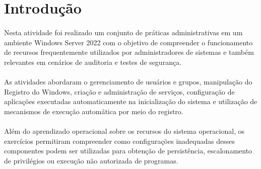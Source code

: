 \section{Introdução}

\paragraph{}
Nesta atividade foi realizado um conjunto de práticas administrativas em um
ambiente Windows Server 2022 com o objetivo de compreender o funcionamento de
recursos frequentemente utilizados por administradores de sistemas e também
relevantes em cenários de auditoria e testes de segurança.

\paragraph{}
As atividades abordaram o gerenciamento de usuários e grupos, manipulação do
Registro do Windows, criação e administração de serviços, configuração de
aplicações executadas automaticamente na inicialização do sistema e utilização
de mecanismos de execução automática por meio do registro.

\paragraph{}
Além do aprendizado operacional sobre os recursos do sistema operacional, os
exercícios permitiram compreender como configurações inadequadas desses
componentes podem ser utilizadas para obtenção de persistência, escalonamento
de privilégios ou execução não autorizada de programas.
